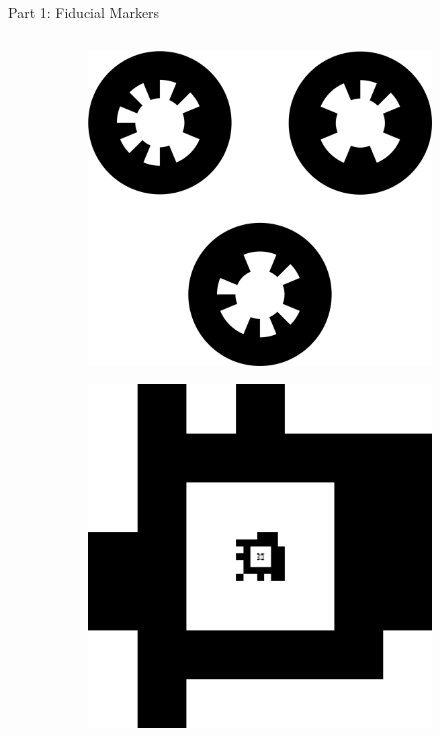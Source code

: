 \documentclass[aspectratio=169]{beamer}
\begin{document}
\begin{frame}{Part 1: Fiducial Markers}
    \begin{columns}
        \begin{column}{0.37\textwidth}
		\vspace{1cm}
		\begin{figure}[]
		    \centering
		    \begin{subfigure}[b]{0.45\linewidth}
			\includegraphics[width=\textwidth]{./images/whycode_multi}
			\label{figure:whycode_bundle}
		    \end{subfigure}
		    \begin{subfigure}[b]{0.45\linewidth}
			\includegraphics[width=\textwidth]{./images/tagCustom24h10_00002_00001_00000}
			\label{figure:apriltag24h10}
		    \end{subfigure}


\end{figure}
\end{column}
\end{columns}
\end{frame}
\end{document}
